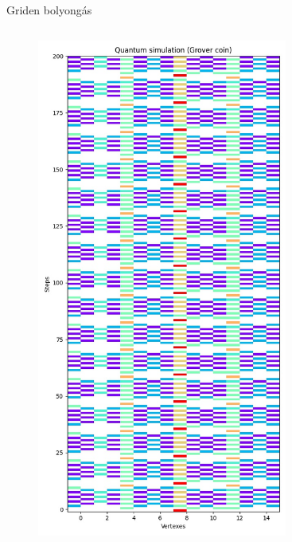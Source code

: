 \documentclass[aspectratio=169]{beamer}
\begin{document}
\begin{frame}{Griden bolyongás}
\begin{columns}[onlytextwidth]
\begin{column}{.23\textwidth}
      \begin{figure}
        \includegraphics[width=0.9\textwidth]{./tdk_figures/results/grid/grover.jpg}
      \end{figure}
    \end{column}
    \begin{column}{.23\textwidth}
      \begin{figure}

\end{figure}
\end{column}
\end{columns}
\end{frame}
\end{document}
